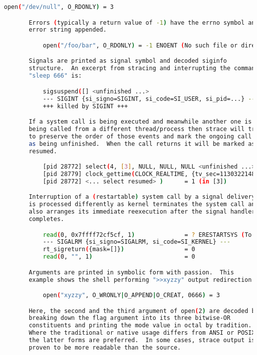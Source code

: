{{\begin{lstlisting}[language=bash]
           open("/dev/null", O_RDONLY) = 3

       Errors (typically a return value of -1) have the errno symbol and
       error string appended.

           open("/foo/bar", O_RDONLY) = -1 ENOENT (No such file or directory)

       Signals are printed as signal symbol and decoded siginfo
       structure.  An excerpt from stracing and interrupting the command
       "sleep 666" is:

           sigsuspend([] <unfinished ...>
           --- SIGINT {si_signo=SIGINT, si_code=SI_USER, si_pid=...} ---
           +++ killed by SIGINT +++

       If a system call is being executed and meanwhile another one is
       being called from a different thread/process then strace will try
       to preserve the order of those events and mark the ongoing call
       as being unfinished.  When the call returns it will be marked as
       resumed.

           [pid 28772] select(4, [3], NULL, NULL, NULL <unfinished ...>
           [pid 28779] clock_gettime(CLOCK_REALTIME, {tv_sec=1130322148, tv_nsec=3977000}) = 0
           [pid 28772] <... select resumed> )      = 1 (in [3])

       Interruption of a (restartable) system call by a signal delivery
       is processed differently as kernel terminates the system call and
       also arranges its immediate reexecution after the signal handler
       completes.

           read(0, 0x7ffff72cf5cf, 1)              = ? ERESTARTSYS (To be restarted)
           --- SIGALRM {si_signo=SIGALRM, si_code=SI_KERNEL} ---
           rt_sigreturn({mask=[]})                 = 0
           read(0, "", 1)                          = 0

       Arguments are printed in symbolic form with passion.  This
       example shows the shell performing ">>xyzzy" output redirection:

           open("xyzzy", O_WRONLY|O_APPEND|O_CREAT, 0666) = 3

       Here, the second and the third argument of open(2) are decoded by
       breaking down the flag argument into its three bitwise-OR
       constituents and printing the mode value in octal by tradition.
       Where the traditional or native usage differs from ANSI or POSIX,
       the latter forms are preferred.  In some cases, strace output is
       proven to be more readable than the source.


\end{lstlisting}}}
